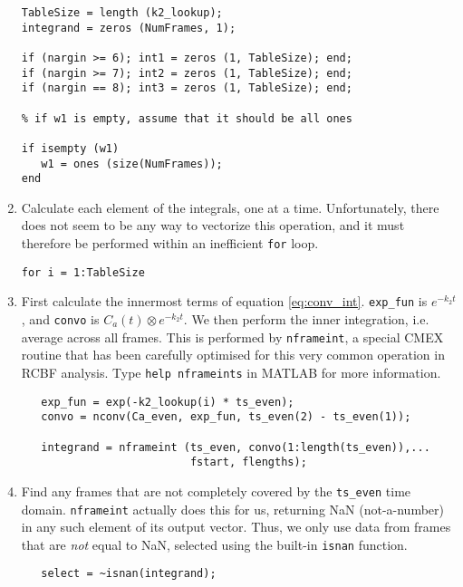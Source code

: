 \documentclass[12pt]{article}
\def\code#1{{\tt #1}}
\begin{document}
\begin{enumerate}
\begin{verbatim}
TableSize = length (k2_lookup);
integrand = zeros (NumFrames, 1);

if (nargin >= 6); int1 = zeros (1, TableSize); end;
if (nargin >= 7); int2 = zeros (1, TableSize); end;
if (nargin == 8); int3 = zeros (1, TableSize); end;

% if w1 is empty, assume that it should be all ones

if isempty (w1)
   w1 = ones (size(NumFrames));
end
\end{verbatim}

\item Calculate each element of the integrals, one at a time.
Unfortunately, there does not seem to be any way to vectorize this
operation, and it must therefore be performed within an inefficient
\code{for} loop.

\begin{verbatim}
for i = 1:TableSize
\end{verbatim}

\item First calculate the innermost terms of equation
  \ref{eq:conv_int}.  \code{exp\_fun} is $e^{-k_2 t}$, and \code{convo}
  is $C_a (t) \otimes e^{-k_2 t}$.  We then perform the inner
  integration, i.e. average across all frames.  This is performed by
  \code{nframeint}, a special CMEX routine that has been carefully
  optimised for this very common operation in RCBF analysis.  Type
  \code{help nframeints} in MATLAB for more information.
\begin{verbatim}
   exp_fun = exp(-k2_lookup(i) * ts_even);
   convo = nconv(Ca_even, exp_fun, ts_even(2) - ts_even(1));

   integrand = nframeint (ts_even, convo(1:length(ts_even)),...
                          fstart, flengths);
\end{verbatim}

\item Find any frames that are not completely covered by the
  \code{ts\_even} time domain.  \code{nframeint} actually does this
  for us, returning NaN (not-a-number) in any such element of its
  output vector.  Thus, we only use data from frames that are {\em
  not} equal to NaN, selected using the built-in \code{isnan}
  function.
\begin{verbatim}
   select = ~isnan(integrand);
\end{verbatim}


\end{enumerate}
\end{document}
